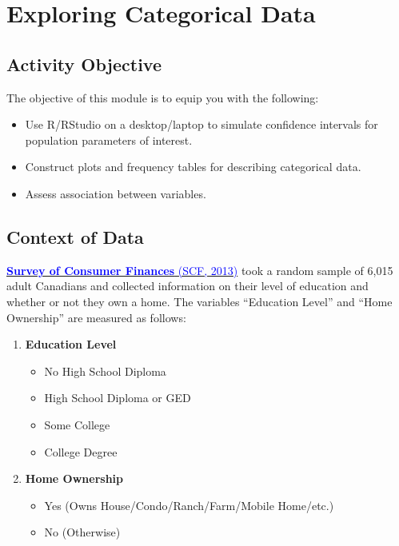 \documentclass[oneside,openany]{book}
\begin{document}
\chapter{Exploring Categorical Data}\label{activity-1---exploring-categorical-data}

\section{Activity Objective}

The objective of this module is to equip you with the following:

\begin{itemize}
    \item Use R/RStudio on a desktop/laptop to simulate confidence intervals for population parameters of interest.
    \item Construct plots and frequency tables for describing categorical data.
    \item Assess association between variables.
\end{itemize}


\section{Context of Data}\label{context-of-data}

\href{https://www23.statcan.gc.ca/imdb/p2SV.pl?Function=getSurvey&SDDS=3502}{\textcolor{blue}{\textbf{Survey of Consumer Finances} (SCF, 2013)}}
 took a random sample of 6,015 adult Canadians and collected information on their level of education and whether or not they own a home. The variables ``Education Level'' and ``Home Ownership'' are measured as follows:

\begin{enumerate}
    \item \textbf{Education Level}
    \begin{itemize}
        \item No High School Diploma
        \item High School Diploma or GED
        \item Some College
        \item College Degree
    \end{itemize}
    \item \textbf{Home Ownership}
    \begin{itemize}
        \item Yes (Owns House/Condo/Ranch/Farm/Mobile Home/etc.)
        \item No (Otherwise)
    \end{itemize}
\end{enumerate}
\end{document}
